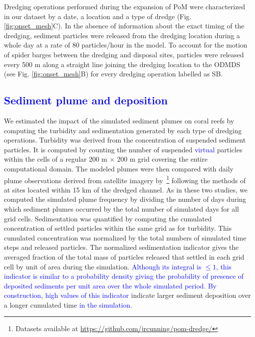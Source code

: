\documentclass[preprint,12pt,authoryear]{elsarticle}
\newcommand{\modif}[1]{\textcolor{blue}{#1}}
\begin{document}
Dredging operations performed during the expansion of PoM were characterized in our dataset by a date, a location and a type of dredge (Fig. \ref{fig:onset_mesh}C). In the absence of information about the exact timing of the dredging, sediment particles were released from the dredging location during a whole day at a rate of 80 particles/hour in the model. To account for the motion of spider barges between the dredging and disposal sites, particles were released every 500 m along a straight line joining the dredging location to the ODMDS (see Fig. \ref{fig:onset_mesh}B) for every dredging operation labelled as SB.

\modif{\subsection{Sediment plume and deposition}}

We estimated the impact of the simulated sediment plumes on coral reefs by computing the turbidity and sedimentation generated by each type of dredging operations. Turbidity was derived from the concentration of suspended sediment particles. It is computed by counting the number of suspended \modif{virtual} particles within the cells of a regular 200 m $\times$ 200 m grid covering the entire computational domain. The modeled plumes were then compared with daily plume observations derived from satellite imagery by~\cite{cunning2019extensive}\footnote{Datasets available at \url{https://github.com/jrcunning/pom-dredge/}} following the methods of \cite{barnes2015sediment} at sites located within 15 km of the dredged channel. As in these two studies, we computed the simulated plume frequency by dividing the number of days during which sediment plumes occurred by the total number of simulated days for all grid cells. Sedimentation was quantified by computing the cumulated concentration of settled particles within the same grid as for turbidity. This cumulated concentration was normalized by the total numbers of simulated time steps and released particles. The normalized sedimentation indicator gives the averaged fraction of the total mass of particles released that settled in each grid cell by unit of area during the simulation. \modif{Although its integral is $\leq 1$, this indicator is similar to a probability density giving the probability of presence of deposited sediments per unit area over the whole simulated period. By construction, high values of this indicator} indicate larger sediment deposition over a longer cumulated time \modif{in the simulation}.
\end{document}
